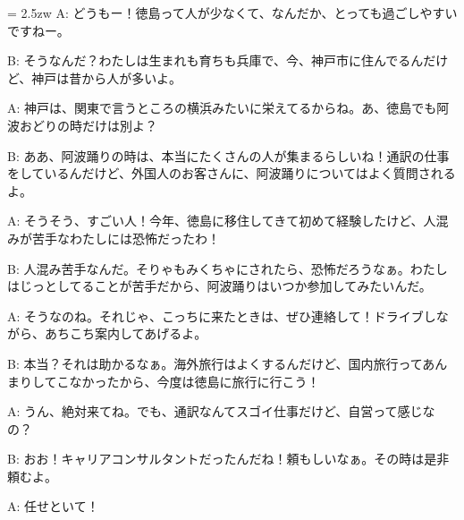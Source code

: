 \documentclass[11pt]{amsart}
\title{}
\author{}
\newenvironment{hangall}[1]{\hangindent = 2.5zw\everypar{\hangindent = 2.5zw}}{}
\begin{document}
\maketitle
\begin{hangall}{}%
A: どうもー！徳島って人が少なくて、なんだか、とっても過ごしやすいですねー。



B: そうなんだ？わたしは生まれも育ちも兵庫で、今、神戸市に住んでるんだけど、神戸は昔から人が多いよ。



A: 神戸は、関東で言うところの横浜みたいに栄えてるからね。あ、徳島でも阿波おどりの時だけは別よ？



B: ああ、阿波踊りの時は、本当にたくさんの人が集まるらしいね！通訳の仕事をしているんだけど、外国人のお客さんに、阿波踊りについてはよく質問されるよ。



A: そうそう、すごい人！今年、徳島に移住してきて初めて経験したけど、人混みが苦手なわたしには恐怖だったわ！



B: 人混み苦手なんだ。そりゃもみくちゃにされたら、恐怖だろうなぁ。わたしはじっとしてることが苦手だから、阿波踊りはいつか参加してみたいんだ。



A: そうなのね。それじゃ、こっちに来たときは、ぜひ連絡して！ドライブしながら、あちこち案内してあげるよ。



B: 本当？それは助かるなぁ。海外旅行はよくするんだけど、国内旅行ってあんまりしてこなかったから、今度は徳島に旅行に行こう！



A: うん、絶対来てね。でも、通訳なんてスゴイ仕事だけど、自営って感じなの？



B: おお！キャリアコンサルタントだったんだね！頼もしいなぁ。その時は是非頼むよ。



A: 任せといて！\end{hangall}
\end{document}
